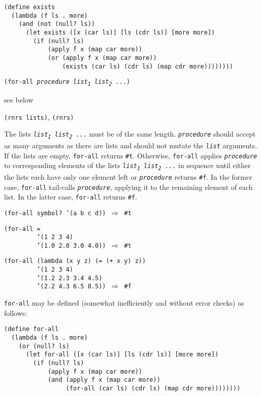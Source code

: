 \begin{alltt}
(define exists
  (lambda (f ls . more)
    (and (not (null? ls))
      (let exists ([x (car ls)] [ls (cdr ls)] [more more])
        (if (null? ls)
            (apply f x (map car more))
            (or (apply f x (map car more))
                (exists (car ls) (cdr ls) (map cdr more))))))))
\end{alltt}

\begin{description}

\label{control_s37}\item[procedure] \texttt{(for-all \textit{procedure} \textit{list\textsubscript{1}} \textit{list\textsubscript{2}} ...)}



\item[returns] see below


\item[libraries] \texttt{(rnrs lists)}, \texttt{(rnrs)}
\end{description}


The lists \texttt{\textit{list\textsubscript{1}} \textit{list\textsubscript{2}} ...} must be of the same length.
\texttt{\textit{procedure}} should accept as many arguments as there are lists and should
not mutate the \texttt{\textit{list}} arguments.
If the lists are empty, \texttt{for-all} returns \texttt{\#{}t}.
Otherwise, \texttt{for-all} applies \texttt{\textit{procedure}} to corresponding elements
of the lists \texttt{\textit{list\textsubscript{1}} \textit{list\textsubscript{2}} ...} in sequence until either the
lists each have only one element left or \texttt{\textit{procedure}} returns \texttt{\#{}f}.
In the former case, \texttt{for-all} tail-calls \texttt{\textit{procedure}}, applying it to the
remaining element of each list.
In the latter case, \texttt{for-all} returns \texttt{\#{}f}.


\begin{alltt}
(for-all symbol? '(a b c d)) \(\Rightarrow\) \#{}t

(for-all =
         '(1 2 3 4)
         '(1.0 2.0 3.0 4.0)) \(\Rightarrow\) \#{}t

(for-all (lambda (x y z) (= (+ x y) z))
         '(1 2 3 4)
         '(1.2 2.3 3.4 4.5)
         '(2.2 4.3 6.5 8.5)) \(\Rightarrow\) \#{}f
\end{alltt}

\texttt{for-all} may be defined (somewhat inefficiently and without error
checks) as follows:

\begin{alltt}
(define for-all
  (lambda (f ls . more)
    (or (null? ls)
      (let for-all ([x (car ls)] [ls (cdr ls)] [more more])
        (if (null? ls)
            (apply f x (map car more))
            (and (apply f x (map car more))
                 (for-all (car ls) (cdr ls) (map cdr more))))))))
\end{alltt}

